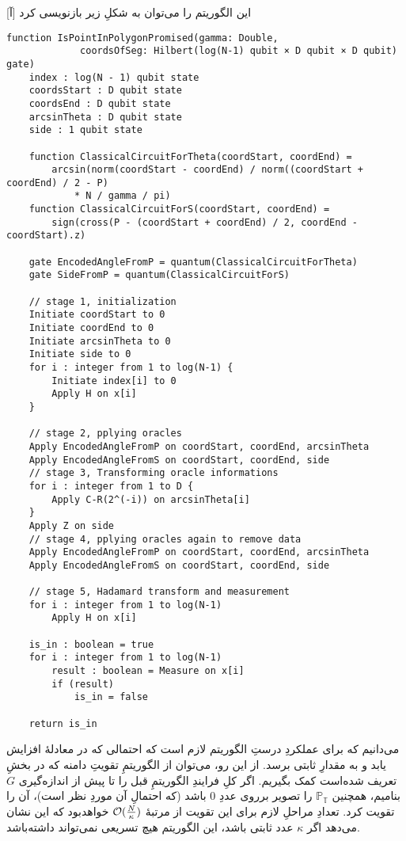 این الگوریتم را می‌توان به شکلِ زیر بازنویسی کرد
[آ]
\begin{latin}
\begin{lstlisting}
function IsPointInPolygonPromised(gamma: Double,
             coordsOfSeg: Hilbert(log(N-1) qubit × D qubit × D qubit) gate)
    index : log(N - 1) qubit state
    coordsStart : D qubit state
    coordsEnd : D qubit state
    arcsinTheta : D qubit state
    side : 1 qubit state

    function ClassicalCircuitForTheta(coordStart, coordEnd) = 
        arcsin(norm(coordStart - coordEnd) / norm((coordStart + coordEnd) / 2 - P) 
            * N / gamma / pi)
    function ClassicalCircuitForS(coordStart, coordEnd) = 
        sign(cross(P - (coordStart + coordEnd) / 2, coordEnd - coordStart).z)
        
    gate EncodedAngleFromP = quantum(ClassicalCircuitForTheta)
    gate SideFromP = quantum(ClassicalCircuitForS)
    
    // stage 1, initialization
    Initiate coordStart to 0
    Initiate coordEnd to 0
    Initiate arcsinTheta to 0
    Initiate side to 0
    for i : integer from 1 to log(N-1) {
        Initiate index[i] to 0
        Apply H on x[i]
    }
    
    // stage 2, pplying oracles
    Apply EncodedAngleFromP on coordStart, coordEnd, arcsinTheta
    Apply EncodedAngleFromS on coordStart, coordEnd, side
    // stage 3, Transforming oracle informations
    for i : integer from 1 to D {
        Apply C-R(2^(-i)) on arcsinTheta[i]
    }
    Apply Z on side
    // stage 4, pplying oracles again to remove data
    Apply EncodedAngleFromP on coordStart, coordEnd, arcsinTheta
    Apply EncodedAngleFromS on coordStart, coordEnd, side
    
    // stage 5, Hadamard transform and measurement
    for i : integer from 1 to log(N-1)
        Apply H on x[i]
        
    is_in : boolean = true
    for i : integer from 1 to log(N-1)
        result : boolean = Measure on x[i]
        if (result)
            is_in = false

    return is_in
\end{lstlisting}
\end{latin}

می‌دانیم که برای عملکردِ درستِ الگوریتم لازم است که احتمالی که در معادلهٔ  افزایش یابد و به مقدارِ ثابتی برسد. از این رو، می‌توان از الگوریتمِ تقویتِ دامنه که در بخشِ  تعریف شده‌است کمک بگیریم.
اگر کلِ فرایندِ الگوریتمِ قبل را تا پیش از اندازه‌گیری $G$ بنامیم، همچنین 
$\mathbb{P_T}$
را تصویر برروی عددِ $0$ باشد (که احتمالِ آن موردِ نظر است)، آن را تقویت کرد.
تعدادِ مراحلِ لازم برای این تقویت از مرتبهٔ
$\mathcal{O}(\frac{N}{\kappa})$
خواهدبود که این نشان می‌دهد اگر $\kappa$ عدد ثابتی باشد، این الگوریتم هیچ تسریعی نمی‌تواند داشته‌باشد.

